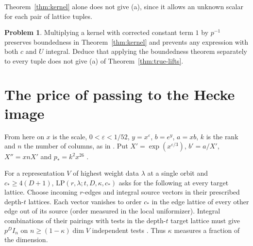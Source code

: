 \documentclass[reqno]{amsart}
\theoremstyle{definition}
\newtheorem{problem}{Problem}[section]
\theoremstyle{plain}
\newcommand{\LP}{\mathrm{LP}}
\begin{document}
Theorem~\ref{thm:kernel} alone does not give (a), since it allows an unknown scalar for each pair of lattice tuples.
\begin{problem}\label{pr:normalization}
Multiplying a kernel with corrected constant term \(1\) by \(p^{-1}\) preserves boundedness in Theorem~\ref{thm:kernel} and prevents any expression with both \(c\) and \(U\) integral. Deduce that applying the boundedness theorem separately to every tuple does not give (a) of Theorem~\ref{thm:true-lifts}.
\end{problem}

\section{The price of passing to the Hecke image}\label{sec:image}
From here on \(x\) is the scale, \(0<\varepsilon<1/52\), \(y=x^\varepsilon\), \(b=e^y\), \(a=xb\), \(k\) is the rank and \(n\) the number of columns, as in \cite[\S5]{Adr}.  Put \(X'=\exp(x^{\varepsilon/3})\), \(b'=a/X'\), \(X''=xnX'\) and \(p_*=k^2x^{26}\) \cite[\S12.1]{Adr}.

For a representation \(V\) of highest weight data \(\lambda\) at a single orbit and \(c_*\ge4(D+1)\), \(\LP(r,\lambda;t,D,\kappa,c_*)\) asks for the following at every target lattice. Choose incoming \(r\)-edges and integral source vectors in their prescribed depth-\(t\) lattices. Each vector vanishes to order \(c_*\) in the edge lattice of every other edge out of its source (order measured in the local uniformizer). Integral combinations of their pairings with tests in the depth-\(t\) target lattice must give \(p^D I_n\) on \(n\ge(1-\kappa)\dim V\) independent tests \cite[Def.~12.6]{Adr}. Thus \(\kappa\) measures a fraction of the dimension.
\end{document}
